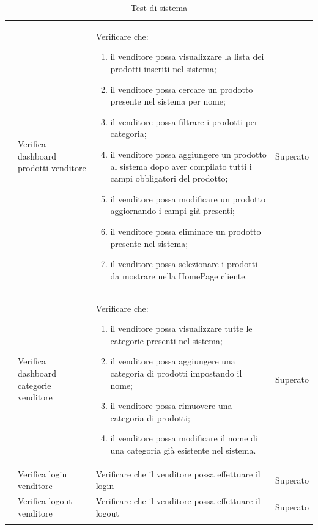 \begin{center}
\begin{longtable}{|p{0.85cm}|p{2.25cm}|p{9cm}|p{3cm}|}
		 & Verifica dashboard prodotti venditore & Verificare che:
		\begin{enumerate}
			\item il venditore possa visualizzare la lista dei prodotti inseriti nel sistema;
			\item il venditore possa cercare un prodotto presente nel sistema per nome;
			\item il venditore possa filtrare i prodotti per categoria;
			\item il venditore possa aggiungere un prodotto al sistema dopo aver compilato tutti i campi obbligatori del prodotto;
			\item il venditore possa modificare un prodotto aggiornando i campi già presenti;
			\item il venditore possa eliminare un prodotto presente nel sistema;
			\item il venditore possa selezionare i prodotti da mostrare nella HomePage cliente.
		\end{enumerate} & Superato\\

		 & Verifica dashboard categorie venditore & Verificare che:
		\begin{enumerate}
			\item il venditore possa visualizzare tutte le categorie presenti nel sistema;
			\item il venditore possa aggiungere una categoria di prodotti impostando il nome;
			\item il venditore possa rimuovere una categoria di prodotti;
			\item il venditore possa modificare il nome di una categoria già esistente nel sistema.
		\end{enumerate} & Superato\\

		 & Verifica login venditore & Verificare che il venditore possa effettuare il login & Superato \\

		 & Verifica logout venditore & Verificare che il venditore possa effettuare il logout & Superato\\

		\hline
		\caption{Test di sistema}
	\end{longtable}
\end{center}


